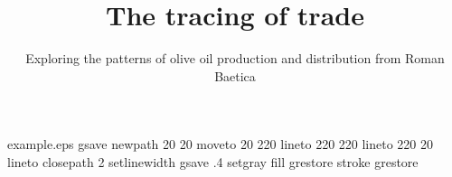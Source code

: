 %
%
%
%
%
\begin{filecontents*}{example.eps}
gsave
newpath
  20 20 moveto
  20 220 lineto
  220 220 lineto
  220 20 lineto
closepath
2 setlinewidth
gsave
  .4 setgray fill
grestore
stroke
grestore
\end{filecontents*}
%
\RequirePackage{fix-cm}
%
\documentclass[smallextended]{svjour3}       %
%
\smartqed  %
%

\usepackage{hyperref}
\usepackage{graphicx}
\usepackage{wrapfig}
\usepackage{lscape}
\usepackage{rotating}
\usepackage{color}
%

\usepackage{natbib}
%



%
%
%
%
%



\title{The tracing of trade%
}
\subtitle{Exploring the patterns of olive oil production and distribution from Roman Baetica}


